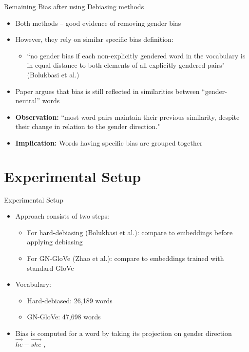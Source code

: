 \documentclass{beamer}
\begin{document}
	
	\begin{frame}{Remaining Bias after using Debiasing methods}
		
		\begin{itemize}
			\item Both methods -- good evidence of removing gender bias
			\item However, they rely on similar specific bias definition:
			\begin{itemize}
				\item ``no gender bias if each non-explicitly gendered word in the vocabulary is in equal distance to both elements of all explicitly
				gendered pairs" (Bolukbasi et al.)
			\end{itemize}
			\item Paper argues that bias is still reflected in similarities between “gender-neutral” words
			\item \textbf{Observation:} ``most word pairs maintain their previous similarity, despite their change in relation to the gender direction."
			\item \textbf{Implication:} Words having specific bias are grouped together
		\end{itemize}
	\end{frame}
	


\section{Experimental Setup}
	\begin{frame}{Experimental Setup}
		\begin{itemize}
			\item Approach consists of two steps:
			\begin{itemize}
				\item For hard-debiasing (Bolukbasi et al.): compare to embeddings before applying debiasing
				\item For GN-GloVe (Zhao et al.): compare to embeddings trained with standard GloVe
			\end{itemize}
			\item Vocabulary:
			\begin{itemize}
				\item Hard-debiased: 26,189 words
				\item GN-GloVe: 47,698 words
			\end{itemize}
			\item Bias is computed for a word by taking its projection on gender direction $\vec{he}-\vec{she}$
,		\end{itemize}
	\end{frame}
\end{document}
